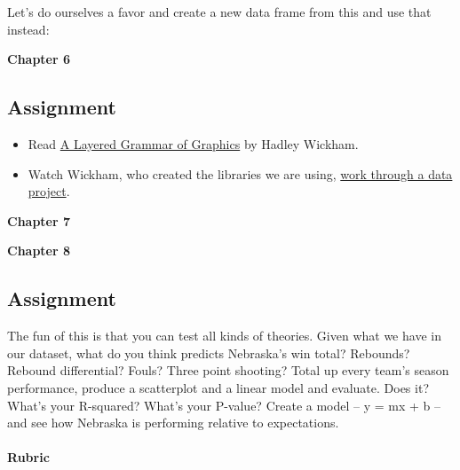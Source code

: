 \documentclass[]{book}
\newenvironment{Shaded}{\begin{snugshade}}{\end{snugshade}}
\newcommand{\KeywordTok}[1]{\textcolor[rgb]{0.13,0.29,0.53}{\textbf{#1}}}
\newcommand{\StringTok}[1]{\textcolor[rgb]{0.31,0.60,0.02}{#1}}
\newcommand{\OperatorTok}[1]{\textcolor[rgb]{0.81,0.36,0.00}{\textbf{#1}}}
\newcommand{\NormalTok}[1]{#1}
\providecommand{\tightlist}{%
  \setlength{\itemsep}{0pt}\setlength{\parskip}{0pt}}
\let\oldparagraph\paragraph
\renewcommand{\paragraph}[1]{\oldparagraph{#1}\mbox{}}
\begin{document}
Let's do ourselves a favor and create a new data frame from this and use
that instead:

\begin{Shaded}
\end{Shaded}

\textbf{Chapter 6}

\subsection{Assignment}\label{assignment-1}

\begin{itemize}
\tightlist
\item
  Read
  \href{https://byrneslab.net/classes/biol607/readings/wickham_layered-grammar.pdf}{A
  Layered Grammar of Graphics} by Hadley Wickham.
\item
  Watch Wickham, who created the libraries we are using,
  \href{https://www.youtube.com/watch?v=go5Au01Jrvs}{work through a data
  project}.
\end{itemize}

\textbf{Chapter 7}

\textbf{Chapter 8}

\subsection{Assignment}\label{assignment-2}

The fun of this is that you can test all kinds of theories. Given what
we have in our dataset, what do you think predicts Nebraska's win total?
Rebounds? Rebound differential? Fouls? Three point shooting? Total up
every team's season performance, produce a scatterplot and a linear
model and evaluate. Does it? What's your R-squared? What's your P-value?
Create a model -- y = mx + b -- and see how Nebraska is performing
relative to expectations.

\paragraph{Rubric}\label{rubric-1}
\end{document}
